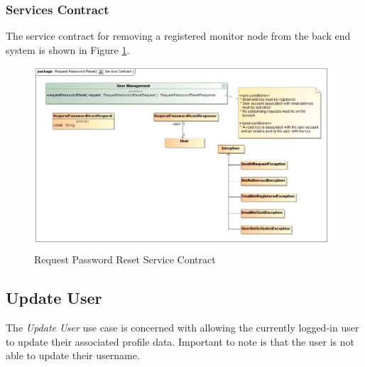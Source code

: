 \subsubsection{Services Contract}
The service contract for removing a registered monitor node from the back end 
system is shown in Figure \ref{fig:requestPasswordResetServicesContract}.
\begin{figure}[H]
  \begin{center}
  \includegraphics[scale=0.4]{../Diagrams and Charts/User Management/Request Password Reset Service Contract.jpg}
  \caption{Request Password Reset Service Contract}
  \label{fig:requestPasswordResetServicesContract}
  \end{center}  
\end{figure}



\subsection{Update User}
The \textit{Update User} use case is concerned with allowing the currently
logged-in user to update their associated profile data. Important to note is 
that the user is not able to update their username.
 
